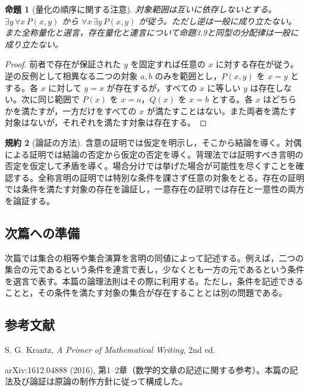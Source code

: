 \documentclass[a5paper,10pt,dvipdfmx]{jsarticle}
\theoremstyle{definition}
\newtheorem{ruledef}{規約}[section]
\theoremstyle{plain}
\newtheorem{prop}[ruledef]{命題}
\begin{document}
\begin{prop}[量化の順序に関する注意]
対象範囲は互いに依存しないとする。$\exists y\,\forall x\,P(x,y)$ から $\forall x\,\exists y\,P(x,y)$ が従う。ただし逆は一般に成り立たない。また全称量化と選言，存在量化と連言について命題3.9と同型の分配律は一般に成り立たない。
\end{prop}
\begin{proof}
前者で存在が保証された $y$ を固定すれば任意の $x$ に対する存在が従う。逆の反例として相異なる二つの対象 $a,b$ のみを範囲とし，$P(x,y)$ を $x=y$ とする。各 $x$ に対して $y=x$ が存在するが，すべての $x$ に等しい $y$ は存在しない。次に同じ範囲で $P(x)$ を $x=a$，$Q(x)$ を $x=b$ とする。各 $x$ はどちらかを満たすが，一方だけをすべての $x$ が満たすことはない。また両者を満たす対象はないが，それぞれを満たす対象は存在する。
\end{proof}
\begin{ruledef}[論証の方法]
含意の証明では仮定を明示し，そこから結論を導く。対偶による証明では結論の否定から仮定の否定を導く。背理法では証明すべき言明の否定を仮定して矛盾を導く。場合分けでは挙げた場合が可能性を尽くすことを確認する。全称言明の証明では特別な条件を課さず任意の対象をとる。存在の証明では条件を満たす対象の存在を論証し，一意存在の証明では存在と一意性の両方を論証する。
\end{ruledef}
\subsection*{次篇への準備}
次篇では集合の相等や集合演算を言明の同値によって記述する。例えば，二つの集合の元であるという条件を連言で表し，少なくとも一方の元であるという条件を選言で表す。本篇の論理法則はその際に利用する。ただし，条件を記述できることと，その条件を満たす対象の集合が存在することとは別の問題である。
\enlargethispage{3\baselineskip}
\subsection*{参考文献}
S. G. Krantz, \textit{A Primer of Mathematical Writing}, 2nd ed.\par
\noindent arXiv:1612.04888 (2016), 第1--2章（数学的文章の記述に関する参考）。本篇の記法及び論証は原論の制作方針に従って構成した。
\end{document}
